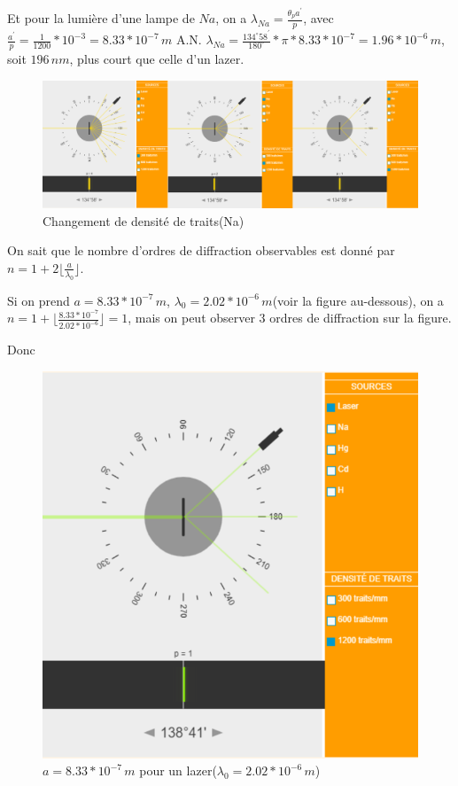 \documentclass[a4paper,12pt]{book}
\begin{document}
Et pour la lumière d'une lampe de $Na$, on a $\boxed{\lambda_{Na}=\frac{\theta_pa^{'}}{p}}$, avec $\frac{a^{'}}{p}=\frac{1}{1200}*10^{-3}=8.33*10^{-7}\,m$
A.N. $\boxed{\lambda_{Na}=\frac{134^\circ58^{'}}{180^\circ}*\pi*8.33*10^{-7}=1.96*10^{-6}\,m}$, soit $196\,nm$, plus court que celle d'un lazer.
\begin{figure}[h]
    \begin{center}
    \includegraphics[scale=0.5]{tr134.png}
    \end{center}
    \caption{Changement de densité de traits(Na)}
\end{figure}  

On sait que le nombre d'ordres de diffraction observables est donné par $n=1+2\lfloor\frac{a}{\lambda_0}\rfloor$. 

Si on prend $a=8.33*10^{-7}\,m$, $\lambda_0=2.02*10^{-6}\,m$(voir la figure au-dessous), on a 
$n=1+\lfloor\frac{8.33*10^{-7}}{2.02*10^{-6}}\rfloor=1$, mais on peut observer $3$ ordres de diffraction sur la figure. 

Donc 
\begin{figure}[h]
    \begin{center}
    \includegraphics[scale=0.5]{tr135.png}
    \end{center}
    \caption{$a=8.33*10^{-7}\,m$ pour un lazer($\lambda_0=2.02*10^{-6}\,m$)}
\end{figure} 
\end{document}
